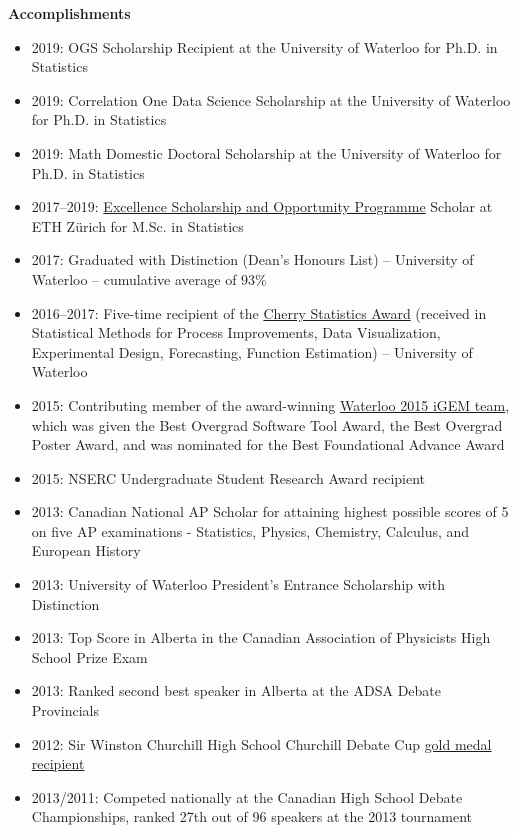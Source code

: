 \documentclass[letterpaper,11pt]{article}
\newcommand{\resheading}[1]{\colorbox{resBlue}{\begin{minipage}{\textwidth}
			\textbf{#1}
\end{minipage}} \vspace{-14pt}}
\begin{document}
\resheading{Accomplishments}
\vspace{4pt}
{\footnotesize
\begin{itemize}
	\item 2019: OGS Scholarship Recipient at the University of Waterloo for Ph.D. in Statistics
	\item 2019: Correlation One Data Science Scholarship at the University of Waterloo for Ph.D. in Statistics
	\item 2019: Math Domestic Doctoral Scholarship at the University of Waterloo for Ph.D. in Statistics
	\item 2017--2019: \href{https://www.ethz-foundation.ch/en/esop/}{Excellence Scholarship and Opportunity Programme} Scholar at ETH Z\"urich for M.Sc. in Statistics
	\item 2017: Graduated with Distinction (Dean's Honours List) -- University of Waterloo -- cumulative average of 93\%
	\item 2016--2017: Five-time recipient of the \href{https://uwaterloo.ca/student-awards-financial-aid/awards/winston-and-diana-cherry-awards-statistics}{Cherry Statistics Award} (received in Statistical Methods for Process Improvements, Data Visualization, Experimental Design, Forecasting, Function Estimation) -- University of Waterloo
	\item 2015: Contributing member of the award-winning \href{http://2015.igem.org/Team:Waterloo}{Waterloo 2015 iGEM team}, which was given the Best Overgrad Software Tool Award, the Best Overgrad Poster Award, and was nominated for the Best Foundational Advance Award
	\item 2015: NSERC Undergraduate Student Research Award recipient
	\item 2013: Canadian National AP Scholar for attaining highest possible scores of 5 on five AP examinations - Statistics, Physics, Chemistry, Calculus, and European History
	\item 2013: University of Waterloo President's Entrance Scholarship with Distinction
	\item 2013: Top Score in Alberta in the Canadian Association of Physicists High School Prize Exam
	\item 2013: Ranked second best speaker in Alberta at the ADSA Debate Provincials
	\item 2012: Sir Winston Churchill High School Churchill Debate Cup  \href{http://www.calgaryherald.com/life/Honours+handed+Winston+Churchill+Society+Calgary+dinner/8742754/story.html}{gold medal recipient}
	\item 2013/2011: Competed nationally at the Canadian High School Debate Championships, ranked 27th out of 96 speakers at the 2013 tournament
\end{itemize}}
\end{document}
